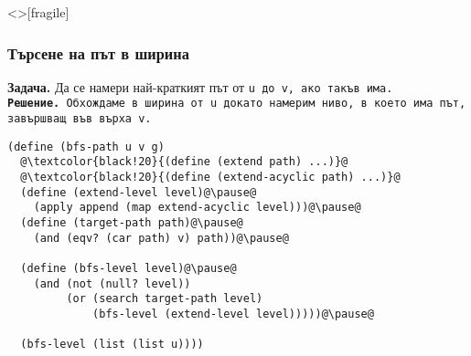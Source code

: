 \documentclass[alsotrans,beameroptions={aspectratio=169}]{beamerswitch}
\begin{document}
\begin{frame}<>[fragile]
  \frametitle{Търсене на път в ширина}

  \sizeboth\footnotesize
  \textbf{Задача.} Да се намери \alert{най-краткият} път от \tt u до \tt v, ако такъв има.\\
  \pause
  \textbf{Решение.} Обхождаме в ширина от \tt u докато намерим ниво, в което има път, завършващ във върха  \tt v.
  \pause
\begin{lstlisting}
(define (bfs-path u v g)
  @\textcolor{black!20}{(define (extend path) ...)}@
  @\textcolor{black!20}{(define (extend-acyclic path) ...)}@
  (define (extend-level level)@\pause@
    (apply append (map extend-acyclic level)))@\pause@
  (define (target-path path)@\pause@
    (and (eqv? (car path) v) path))@\pause@

  (define (bfs-level level)@\pause@
    (and (not (null? level))
         (or (search target-path level)
             (bfs-level (extend-level level)))))@\pause@

  (bfs-level (list (list u))))
\end{lstlisting}
\end{frame}
\end{document}
